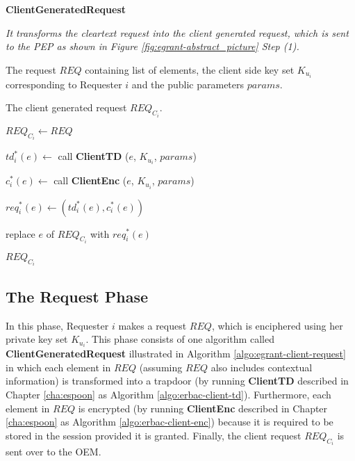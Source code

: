 \documentclass[epsfig,a4paper,11pt,titlepage]{book}
\numberwithin{algorithm}{chapter}
\newcommand{\algofontsize}{\fontsize{11}{12}\selectfont}
\begin{document}
\begin{algorithm} [htp]
{\algofontsize
\caption{\textbf{ClientGeneratedRequest}}

\label{algo:egrant-client-request}

\begin{algorithmic}[1]

\INPUT \emph{It transforms the cleartext request into the client generated request, which is sent to the \gls{PEP} as shown in Figure \ref{fig:egrant-abstract_picture} Step (1).}

\Require The request $\mathit{REQ}$ containing list of elements, the client side key set $K_{u_i}$ corresponding to Requester $i$ and the public parameters $params$.

\Ensure The client generated request ${\mathit{REQ}}_{C_i}$.

\medskip

\State ${\mathit{REQ}}_{C_i} \leftarrow REQ$


	\State $td^*_i (e) \leftarrow$ call \textbf{ClientTD} ($e$, $K_{u_i}$, $params$)
	
	\State $c^*_i (e) \leftarrow$ call \textbf{ClientEnc} ($e$, $K_{u_i}$, $params$)
	
	\State $\mathit{req}^*_i(e) \leftarrow (td^*_i (e), c^*_i (e))$
	
	\State replace $e$ of ${\mathit{REQ}}_{C_i}$ with $\mathit{req}^*_i(e)$

\EndFor

\Return ${\mathit{REQ}}_{C_i}$

\end{algorithmic}
}
\end{algorithm}

\subsection{The Request Phase}
In this phase, Requester $i$ makes a request $\mathit{REQ}$, which is enciphered using her private key set $K_{u_i}$. This phase consists of one algorithm called \textbf{ClientGeneratedRequest} illustrated in Algorithm \ref{algo:egrant-client-request} in which each element in $\mathit{REQ}$ (assuming $\mathit{REQ}$ also includes contextual information) is transformed into a trapdoor (by running \textbf{ClientTD} described in Chapter \ref{cha:espoon} as Algorithm \ref{algo:erbac-client-td}). Furthermore, each element in $\mathit{REQ}$ is encrypted (by running \textbf{ClientEnc} described in Chapter \ref{cha:espoon} as Algorithm \ref{algo:erbac-client-enc}) because it is required to be stored in the session provided it is granted. Finally, the client request ${\mathit{REQ}}_{C_i}$ is sent over to the \gls{OEM}.
\end{document}
